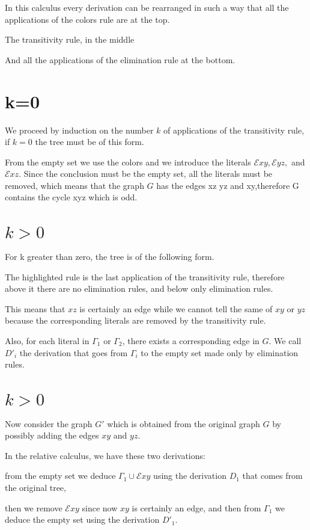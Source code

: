 \documentclass[12pt,a4paper,oneside]{article}
\newcommand{\E}{\mathscr{E}}
\begin{document}
In this calculus every derivation can be rearranged in such a way that all the applications of the colors rule are at the top.

The transitivity rule, in the middle

And all the applications of the elimination rule at the bottom.

\section{k=0}
We proceed by induction on the number $k$ of applications of the transitivity rule, if $k=0$ the tree must be of this form.

From the empty set we use the colors and we introduce the literals 
$\E xy, \E yz, $ and $\E xz$. Since the conclusion must be the empty set, all the literals must be removed, which means that the graph $G$ has the edges xz yz and xy,therefore G contains the cycle xyz which is odd.

\section{$k>0$ }
For k greater than zero, the tree is of the following form.

The highlighted rule is the last application of the transitivity rule, therefore above it there are no elimination rules, and below only elimination rules. 
 
This means that $xz$ is certainly an edge while we cannot tell the same of $xy$ or $yz$  because the corresponding literals are removed by the transitivity rule.

Also, for each literal in $\Gamma_1$ or $\Gamma_2$, there exists a corresponding edge in $G$.
We call $D'_i$ the derivation that goes from $\Gamma_i$ to the empty set made only by elimination rules.

\section{$k>0$ }
Now consider the graph $G'$ which is obtained from the original graph $G$ by possibly adding the edges $xy$ and $yz$. 

In the relative calculus, we have these two derivations: 

from the empty set we deduce $\Gamma_1\cup \E xy$ using the derivation $D_1$ that comes from the original tree, 

then we remove $\E xy$ since now $xy$ is certainly an edge, and then from $\Gamma_1$ we deduce the empty set using the derivation $D'_1$.
\end{document}
